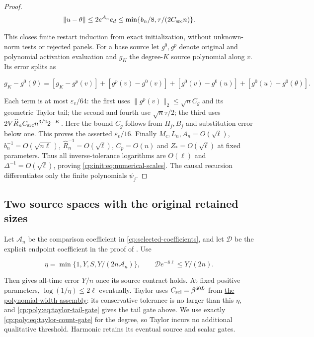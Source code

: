 \begin{proof}
\[
\|u-\theta\|\le2e^{A_n}e_d
 \le\min\{b_n/8,\tau/(2C_{\rm src}n)\}.
\]

This closes finite restart induction from exact initialization, without
unknown-norm tests or rejected panels. For a base source let $g^0,g^p$
denote original and polynomial activation evaluation and $g_K$ the
degree-$K$ source polynomial along $v$. Its error splits as

\[
g_K-g^0(\theta)=[g_K-g^p(v)]+[g^p(v)-g^0(v)]
              +[g^0(v)-g^0(u)]+[g^0(u)-g^0(\theta)].
\]

Each term is at most $\varepsilon_v/64$: the first uses
$\|g^p(v)\|_2\le\sqrt n C_g$ and its geometric Taylor tail;
the second and fourth use $\sqrt n\tau/2$; the third uses
$2V\widehat R_nC_{\rm src}n^{3/2}2^{-K}$.
Here the bound $C_g$ follows from $H_j,B_j$ and substitution
error below one. This proves the asserted $\varepsilon_v/16$.
Finally $M_c,L_n,A_n=O(\sqrt\ell)$,
$b_n^{-1}=O(\sqrt{n\ell})$, $\widehat R_n^{-1}=O(\sqrt\ell)$,
$C_p=O(n)$ and $Z_*=O(\sqrt\ell)$ at fixed parameters.
Thus all inverse-tolerance logarithms are $O(\ell)$ and
$\Delta^{-1}=O(\sqrt\ell)$, proving \eqref{cp:init:eq:numerical-scales}.
The causal recursion differentiates only the finite polynomials $\psi_j$.
\end{proof}

\subsection{Two source spaces with the original retained sizes}
\label{cp:init:sec:source-spaces}

Let $\mathcal A_n$ be the comparison coefficient in
\eqref{cp:selected-coefficients}, and let $\mathcal D$ be the
explicit endpoint coefficient in the proof of
. Use

\begin{equation}
\label{cp:init:eq:transfer-tolerance}
\eta=\min\{1,Y,S,Y/(2n\mathcal A_n)\},\qquad
\mathcal D e^{-8\ell}\le Y/(2n).
\end{equation}

Then  gives all-time error $Y/n$ once its source
contract holds. At fixed positive parameters, $\log(1/\eta)\le2\ell$
eventually. Taylor uses $C_{\rm sel}=\beta^{60L}$ from
\hyperref[cp:poly:assembly]{the polynomial-width assembly}: its conservative
tolerance is no larger than this $\eta$, and
\eqref{cp:poly:eq:taylor-tail-gate} gives the tail gate above.
We use exactly \eqref{cp:poly:eq:taylor-count-gate} for the degree,
so Taylor incurs no additional qualitative threshold. Harmonic retains
its eventual source and scalar gates.

